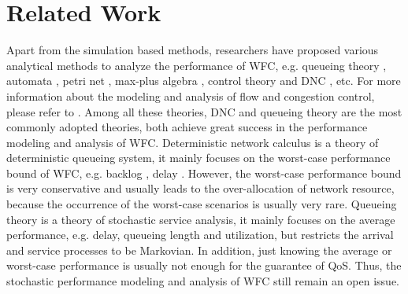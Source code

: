 \documentclass[12pt]{article}
\begin{document}
\section{Related Work}\label{relate}
Apart from the simulation based methods, researchers have proposed various analytical methods to analyze the performance of WFC, e.g. queueing theory \cite{1094531,Chu:1981:ATQ:1310158.1310656,berger1992impact,jung1996analysis,1095377,1092752,113869}, automata \cite{Billington:2007:FTD:1366708.1366712}, petri net \cite{Gaeta2003}, max-plus algebra \cite{BaHo00}, control theory \cite{wang2008internet} and DNC \cite{CrOk96,AgRa96,Chan98,ACOR99,QLDD09FC,bose2006analysis,Qian2010Analysis}, etc. For more information about the modeling and analysis of flow and congestion control, please refer to \cite{srikant2004mathematics}. Among all these theories, DNC and queueing theory are the most commonly adopted theories, both achieve great success in the performance modeling and analysis of WFC. Deterministic network calculus is a theory of deterministic queueing system, it mainly focuses on the worst-case performance bound of WFC, e.g. backlog \cite{QLDD09FC,bose2006analysis}, delay \cite{Qian2010Analysis}. However, the worst-case performance bound is very conservative and usually leads to the over-allocation of network resource, because the occurrence of the worst-case scenarios is usually very rare. Queueing theory is a theory of stochastic service analysis, it mainly focuses on the average performance, e.g. delay, queueing length and utilization, but restricts the arrival and service processes to be Markovian. In addition, just knowing the average or worst-case performance is usually not enough for the guarantee of QoS. Thus, the stochastic performance modeling and analysis of WFC still remain an open issue.
\end{document}
